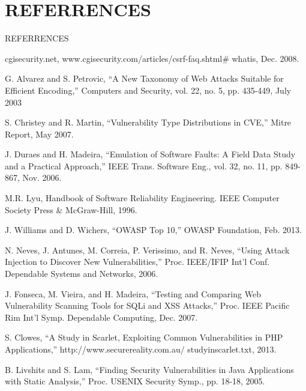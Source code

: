 \documentclass[xcolor=x11names,compress]{beamer}
\renewcommand{\(}{\begin{columns}}
\renewcommand{\)}{\end{columns}}
\newcommand{\<}[1]{\begin{column}{#1}}
\renewcommand{\>}{\end{column}}
\begin{document}
\section*{REFERRENCES}
\begin{frame}
\end{frame}


\begin{frame}[allowframebreaks]{REFERRENCES}
	\tiny
{}
\begin{thebibliography}{8}
	
	cgisecurity.net, www.cgisecurity.com/articles/csrf-faq.shtml\#
	whatis, Dec. 2008.
	
	G. Alvarez and S. Petrovic,  ``A New Taxonomy of Web Attacks Suitable for Efficient Encoding,'' Computers and Security, vol. 22,
	no. 5, pp. 435-449, July 2003
	
	
	
	S. Christey and R. Martin,  ``Vulnerability Type Distributions in
	CVE,'' Mitre Report, May 2007.
	
	J. Duraes and H. Madeira,  ``Emulation of Software Faults: A Field
	Data Study and a Practical Approach,'' IEEE Trans. Software Eng.,
	vol. 32, no. 11, pp. 849-867, Nov. 2006.
	
	M.R. Lyu, Handbook of Software Reliability Engineering. IEEE
	Computer Society Press \& McGraw-Hill, 1996.
	
	J. Williams and D. Wichers,  ``OWASP Top 10,'' OWASP Foundation, Feb. 2013.
	
	N. Neves, J. Antunes, M. Correia, P. Verissimo, and R. Neves,
	``Using Attack Injection to Discover New Vulnerabilities,'' Proc.
	IEEE/IFIP Int’l Conf. Dependable Systems and Networks, 2006.
	
	J. Fonseca, M. Vieira, and H. Madeira,  ``Testing and Comparing
	Web Vulnerability Scanning Tools for SQLi and XSS Attacks,''
	Proc. IEEE Pacific Rim Int’l Symp. Dependable Computing, Dec. 2007.
	
	S. Clowes,  ``A Study in Scarlet, Exploiting Common Vulnerabilities in PHP Applications,'' http://www.securereality.com.au/
	studyinscarlet.txt, 2013.
	
	B. Livshits and S. Lam,  ``Finding Security Vulnerabilities in Java
	Applications with Static Analysis,'' Proc. USENIX Security Symp.,
	pp. 18-18, 2005.
	

\end{thebibliography}
\end{frame}
\end{document}

